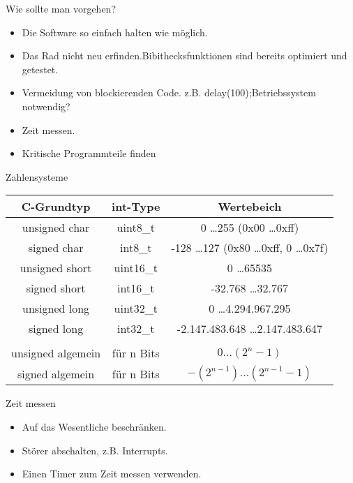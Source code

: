 \documentclass{beamer}
\begin{document}
\begin{frame}{Wie sollte man vorgehen?}

  \begin{itemize}
 \item Die Software so einfach halten wie möglich.\pause 
 \item Das Rad nicht neu erfinden.\newline Bibithecksfunktionen sind bereits optimiert und getestet.\pause
 \item Vermeidung von blockierenden Code. z.B. delay(100);\newline Betriebssystem notwendig? \pause
 \item Zeit messen.\pause
 \item Kritische Programmteile finden 
  \end{itemize}
\end{frame}

\begin{frame}{Zahlensysteme}

\begin{tabular}[c] {ccc}
C-Grundtyp 		& int-Type 	& Wertebeich \\
\hline
unsigned char 	& uint8\_t 	& 0 \ldots 255 (0x00 \ldots 0xff) \\
signed char 		& int8\_t 	& -128 \ldots 127 (0x80 \ldots 0xff, 0 \ldots 0x7f)\\
unsigned short 	& uint16\_t 	& 0 \ldots 65535 \\
signed short 		& int16\_t 	& -32.768 \ldots 32.767\\
unsigned long 	& uint32\_t 	& 0 \ldots 4.294.967.295\\
signed long 		& int32\_t 	& -2.147.483.648 \ldots 2.147.483.647\\
\hline
\\
unsigned algemein& f\"ur n Bits & $0 \ldots (2^n-1)$ \\
signed algemein& f\"ur n Bits& $-(2^{n-1}) \ldots (2^{n-1}-1)$ \\
\end{tabular}
\end{frame}

\begin{frame}{Zeit messen}

\begin{itemize}
 \item Auf das Wesentliche beschränken.\pause 
 \item Störer abschalten, z.B. Interrupts.\pause
 \item Einen Timer zum Zeit messen verwenden.
\end{itemize}
\end{frame}
\end{document}
